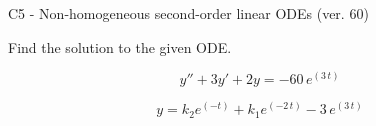 \begin{exercise}
  \begin{exerciseTitle}C5 - Non-homogeneous second-order linear ODEs (ver. 60)\end{exerciseTitle}
  \begin{exerciseStatement}
    
Find the solution to the given ODE.

    
\[y''+3y'+2y = -60 \, e^{\left(3 \, t\right)}\]

  \end{exerciseStatement}
  \begin{exerciseAnswer}
    
\[y= k_{2} e^{\left(-t\right)} + k_{1} e^{\left(-2 \, t\right)} - 3 \, e^{\left(3 \, t\right)}\]

  \end{exerciseAnswer}
\end{exercise}